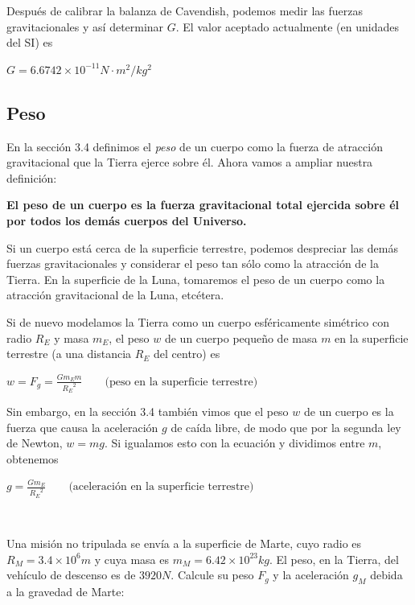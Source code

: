 \documentclass{article}
\newcommand{\newsubsection}[1]{
    \vspace{0.5cm}
    \color{sectionColor}
    \subsection{\bl{#1}}
    \color{black}
    \vspace{0.5cm}
}
\newcommand{\newex}[1]{
    \vspace{0.5cm}
    \noindent{\large \color{exerciceColor} \textbf{#1}}\\[0.2cm]
}
\newcommand{\bl}[1]{\textbf{#1}}
\newcommand{\definicion}[1]{%
    \vspace{0.5cm}
    \begin{definicionbox}
        #1
    \end{definicionbox}
    \vspace{0.5cm}
}
\begin{document}
    \par Después de calibrar la balanza de Cavendish, podemos medir las fuerzas gravitacionales y así determinar $G$. El valor aceptado actualmente (en unidades del SI) es

    \definicion{
        \centering
        \( G = 6.6742 \times 10^{-11} N \cdot m^2 / kg^{2} \)
    }

    \newsubsection{Peso}

    \par En la sección 3.4 deﬁnimos el \textit{peso} de un cuerpo como la fuerza de atracción gravitacional que la Tierra ejerce sobre él. Ahora vamos a ampliar nuestra deﬁnición:

    \definicion{
        \bl{
            El peso de un cuerpo es la fuerza gravitacional total ejercida sobre él por todos los demás cuerpos del Universo.
        }
    }

    \par Si un cuerpo está cerca de la superﬁcie terrestre, podemos despreciar las demás fuerzas gravitacionales y considerar el peso tan sólo como la atracción de la Tierra. En la superﬁcie de la Luna, tomaremos el peso de un cuerpo como la atracción gravitacional de la Luna, etcétera.
    \par Si de nuevo modelamos la Tierra como un cuerpo esféricamente simétrico con radio $R_E$ y masa $m_E$, el peso $w$ de un cuerpo pequeño de masa $m$ en la superﬁcie terrestre (a una distancia $R_E$ del centro) es

    \definicion{
        \centering
        \( w = F_g = \frac{G m_E m}{{R_E}^2} \quad \quad \text{(peso en la superficie terrestre)} \)
    }

    \par Sin embargo, en la sección 3.4 también vimos que el peso $w$ de un cuerpo es la fuerza que causa la aceleración $g$ de caída libre, de modo que por la segunda ley de Newton, $w = mg$. Si igualamos esto con la ecuación y dividimos entre $m$, obtenemos

    \definicion{
        \centering
        \( g = \frac{G m_E}{{R_E}^2} \quad \quad \text{(aceleración en la superficie terrestre)} \)
    }

    \newex{Ejercicio 27. Gravedad en Marte}

    \par Una misión no tripulada se envía a la superﬁcie de Marte, cuyo radio es $R_M = 3.4 \times 10^6 m$ y cuya masa es $m_M = 6.42 \times 10^{23} kg$. El peso, en la Tierra, del vehículo de descenso es de $3920 N$. Calcule su peso $F_g$ y la aceleración $g_M$ debida a la gravedad de Marte: 
\end{document}
